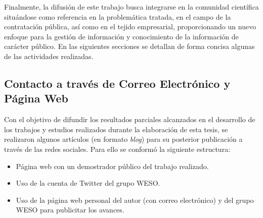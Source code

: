 Finalmente, la difusión de este trabajo busca integrarse en la comunidad científica situándose como referencia en
la problemática tratada, \lod en el campo de la contratación pública, así como en el tejido empresarial, proporcionando un nuevo
enfoque para la gestión de información y conocimiento de la información de carácter público. En las siguientes secciones se detallan 
de forma concisa algunas de las actividades realizadas.

\subsection{Contacto a través de Correo Electrónico y Página Web}
Con el objetivo de difundir los resultados parciales alcanzados en el desarrollo
de los trabajos y estudios realizados durante la elaboración de esta tesis, se realizaron
algunos artículos (en formato \textit{blog}) para su posterior publicación
a través de las redes sociales. Para ello se conformó la siguiente estructura:
\begin{itemize}
 \item Página web con un demostrador público del trabajo realizado.
 \item Uso de la cuenta de Twitter del grupo \gls{WESO}.
 \item Uso de la página web personal del autor (con correo electrónico) y del grupo WESO para publicitar los avances.
\end{itemize}

